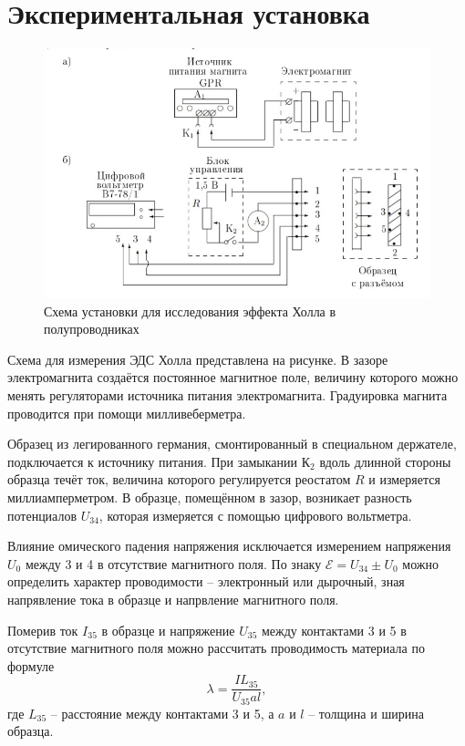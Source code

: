 \documentclass[a4paper,12pt]{article}
\begin{document}
\section{Экспериментальная установка}
	\begin{figure}[h]
		\begin{center}
		\includegraphics[scale=0.5]{fig1}
		\end{center}
		\caption{Схема установки для исследования эффекта Холла в полупроводниках}
		\end{figure}

Схема для измерения ЭДС Холла представлена на рисунке. В зазоре электромагнита создаётся постоянное магнитное поле, величину которого можно менять регуляторами источника питания электромагнита. Градуировка магнита проводится при помощи милливеберметра.\\

\newpage	

Образец из легированного германия, смонтированный в специальном держателе, подключается к источнику питания. При замыкании К$_2$ вдоль длинной стороны образца течёт ток, величина которого регулируется реостатом $R$ и измеряется миллиамперметром. В образце, помещённом в зазор, возникает разность потенциалов $U_{34}$, которая измеряется с помощью цифрового вольтметра.

 Влияние омического падения напряжения исключается измерением напряжения $U_0$ между 3 и 4 в отсутствие магнитного поля. По знаку $\mathcal{E} = U_{34} \pm U_0$ можно определить характер проводимости -- электронный или дырочный, зная напрявление тока в образце и напрвление магнитного поля.
 
 Померив ток $I_{35}$ в образце и напряжение $U_{35}$ между контактами 3 и 5 в отсутствие магнитного поля можно рассчитать проводимость материала по формуле
\begin{equation}
\lambda = \frac{IL_{35}}{U_{35}al},
\end{equation}
где $L_{35}$ -- расстояние между контактами 3 и 5, а $a$ и $l$ -- толщина и ширина образца.
\end{document}
